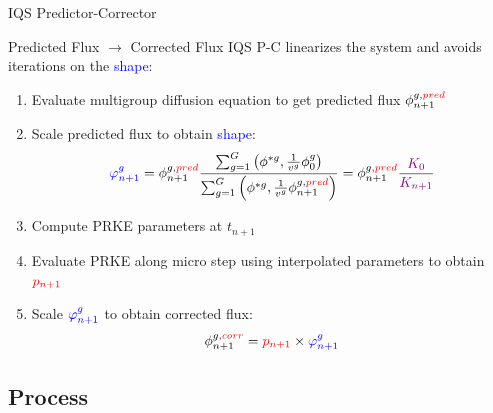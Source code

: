 \documentclass[8pt,xcolor=dvipnames]{beamer}
\newcommand{\ben}{\begin{enumerate}}
\newcommand{\een}{\end{enumerate}}
\newcommand{\tcr}[1]{\textcolor{red}{#1}}
\newcommand{\tcb}[1]{\textcolor{blue}{#1}}
\newcommand{\tcp}[1]{\textcolor{violet}{#1}}
\begin{document}
\begin{frame}{IQS Predictor-Corrector}

\vspace{-3mm}

\begin{block}{Predicted Flux $\rightarrow$ Corrected Flux}
IQS P-C linearizes the system and avoids iterations on the \tcb{shape}: 
\ben
\item Evaluate multigroup diffusion equation to get predicted flux $\phi_{n+1}^{g,\tcr{pred}}$
\item Scale predicted flux to obtain \tcb{shape}:
\[
\tcb{\varphi^{g}_{n+1}} = \phi_{n+1}^{g,\tcr{pred}} \frac{\sum_{g=1}^G\left(\phi^{*g},\frac{1}{v^g}\phi ^g_{0}\right)}{\sum_{g=1}^G \left(\phi^{*g},\frac{1}{v^g}\phi_{n+1}^{g,\tcr{pred}}\right)} = \phi_{n+1}^{g,\tcr{pred}} \frac{\tcp{K_0}}{\tcp{K_{n+1}}}
\]
\item Compute PRKE parameters at $t_{n+1}$
\item Evaluate PRKE along micro step using interpolated parameters to obtain $\tcr{p_{n+1}}$
\item Scale $\tcb{\varphi^{g}_{n+1}}$ to obtain corrected flux:
\[
\phi_{n+1}^{g,\tcr{corr}} = \tcr{p_{n+1}} \times \tcb{\varphi^{g}_{n+1}}
\]
\een
\end{block}

\end{frame}

\subsection{Process}
\end{document}
